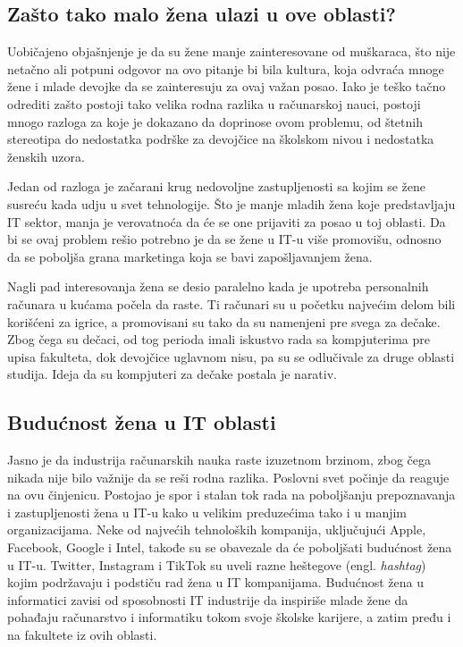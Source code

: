 \documentclass[a4paper,12pt]{article}
\begin{document}
\subsection{Zašto tako malo žena ulazi u ove oblasti? }
\begin{flushleft}
Uobičajeno objašnjenje je da su žene manje zainteresovane od muškaraca, 
što nije netačno ali potpuni odgovor na ovo pitanje bi bila kultura, 
koja odvraća mnoge žene i mlade devojke da se zainteresuju za ovaj važan posao.
Iako je teško tačno odrediti zašto postoji tako velika rodna razlika u računarskoj nauci, 
postoji mnogo razloga za koje je dokazano da doprinose ovom problemu, od štetnih stereotipa do nedostatka podrške za devojčice na školskom nivou i nedostatka ženskih uzora.

Jedan od razloga je začarani krug nedovoljne zastupljenosti sa kojim se žene susreću kada udju u svet tehnologije. 
Što je manje mladih žena koje predstavljaju IT sektor, manja je verovatnoća da će se one prijaviti za posao u toj oblasti. 
Da bi se ovaj problem rešio potrebno je da se žene u IT-u više promovišu, 
odnosno da se poboljša grana marketinga koja se bavi zapošljavanjem žena.


Nagli pad interesovanja žena se desio paralelno kada je upotreba personalnih računara u kućama počela da raste. 
Ti računari su u početku najvećim delom bili korišćeni za igrice, a promovisani su tako da su namenjeni pre svega za dečake. 
Zbog čega su dečaci, od tog perioda imali iskustvo rada sa kompjuterima pre upisa fakulteta, dok devojčice uglavnom nisu, 
pa su se odlučivale za druge oblasti studija. Ideja da su kompjuteri za dečake postala je narativ.
\end{flushleft}


\subsection{Budućnost žena u IT oblasti}
\begin{flushleft}
Jasno je da industrija računarskih nauka raste izuzetnom brzinom, zbog čega nikada nije bilo važnije da se reši rodna razlika.
Poslovni svet počinje da reaguje na ovu činjenicu. Postojao je spor i stalan tok rada na poboljšanju prepoznavanja i zastupljenosti
žena u IT-u kako u velikim preduzećima tako i u manjim organizacijama. Neke od najvećih tehnoloških kompanija, uključujući Apple, 
Facebook, Google i Intel, takođe su se obavezale da će poboljšati budućnost žena u IT-u. Twitter, Instagram i TikTok su uveli razne 
heštegove (engl. \textit{hashtag}) kojim podržavaju i podstiču rad žena u IT kompanijama. Budućnost žena u informatici zavisi od sposobnosti IT industrije 
da inspiriše mlade žene da pohađaju računarstvo i informatiku tokom svoje školske karijere, a zatim pređu i na fakultete iz ovih oblasti.
\end{flushleft}
\end{document}
